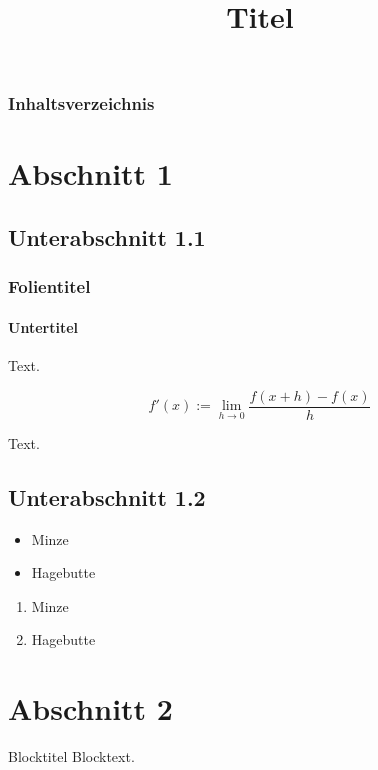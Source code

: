 \documentclass{beamer}
\title{Titel}
\date{}
\begin{document}
\maketitle

\begin{frame}[t]
\frametitle{Inhaltsverzeichnis}

\tableofcontents

\end{frame}


\section{Abschnitt 1}
\subsection{Unterabschnitt 1.1}
\begin{frame}
\frametitle{Folientitel}
\framesubtitle{Untertitel}
Text.
\begin{Definition}[Ableitung]
\[f'(x) := \lim_{h\to 0}\frac{f(x+h)-f(x)}{h}\]
\end{Definition}

\begin{Beispiel}
Text.
\end{Beispiel}

\end{frame}

\subsection{Unterabschnitt 1.2}
\begin{frame}

\begin{itemize}
\item Minze
\item Hagebutte
\end{itemize}


\begin{enumerate}
\item Minze
\item Hagebutte
\end{enumerate}

\end{frame}

\section{Abschnitt 2}
\begin{frame}

\begin{block}{Blocktitel}
Blocktext.
\end{block}

\end{frame}
\end{document}

